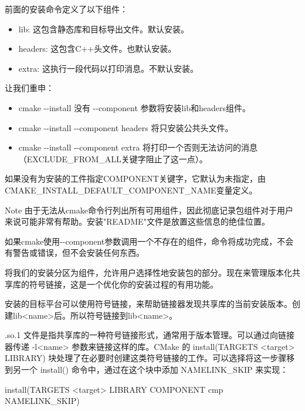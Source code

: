 前面的安装命令定义了以下组件：

\begin{itemize}
\item
lib: 这包含静态库和目标导出文件。默认安装。

\item
headers: 这包含C++头文件。也默认安装。

\item
extra: 这执行一段代码以打印消息。不默认安装。
\end{itemize}

让我们重申：

\begin{itemize}
\item
cmake -{}-install 没有 -{}-component 参数将安装lib和headers组件。

\item
cmake -{}-install -{}-component headers 将只安装公共头文件。

\item
cmake -{}-install -{}-component extra 将打印一个否则无法访问的消息（EXCLUDE\_FROM\_ALL关键字阻止了这一点）。
\end{itemize}

如果没有为安装的工件指定COMPONENT关键字，它默认为未指定，由CMAKE\_INSTALL\_DEFAULT\_COMPONENT\_NAME变量定义。

\begin{myNotic}{Note}
由于无法从cmake命令行列出所有可用组件，因此彻底记录包组件对于用户来说可能非常有帮助。安装"README"文件是放置这些信息的绝佳位置。
\end{myNotic}

如果cmake使用-{}-component参数调用一个不存在的组件，命令将成功完成，不会有警告或错误，但不会安装任何东西。

将我们的安装分区为组件，允许用户选择性地安装包的部分。现在来管理版本化共享库的符号链接，这是一个优化你的安装过程的有用功能。


安装的目标平台可以使用符号链接，来帮助链接器发现共享库的当前安装版本。创建lib<name>后。所以符号链接到lib<name>。

.so.1 文件是指共享库的一种符号链接形式，通常用于版本管理。可以通过向链接器传递 -l<name> 参数来链接这样的库。CMake 的 install(TARGETS <target> LIBRARY) 块处理了在必要时创建这类符号链接的工作。可以选择将这一步骤移到另一个 install() 命令中，通过在这个块中添加 NAMELINK\_SKIP 来实现：

\begin{shell}
install(TARGETS <target> LIBRARY
        COMPONENT cmp NAMELINK_SKIP)
\end{shell}

